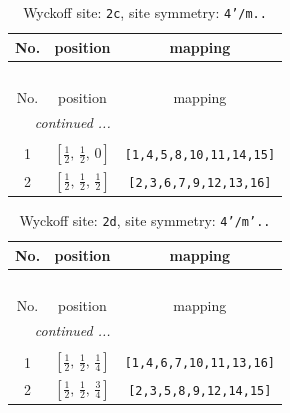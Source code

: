 \documentclass[fleqn,8pt]{jsarticle}
\begin{document}
\renewcommand{\arraystretch}{1.2}
\begin{longtable}{ccc}
\caption{Wyckoff site: {\tt 2c}, site symmetry: {\tt 4'/m..}}
 \\
 \hline \hline
No. & position & mapping \\ \hline \endfirsthead

\multicolumn{2}{l}{\tablename\ \thetable{}} \\
 \hline \hline
No. & position & mapping \\ \hline \endhead

 \hline \hline
\multicolumn{2}{r}{\footnotesize\it continued ...} \\ \endfoot

 \hline \hline
\multicolumn{2}{r}{} \\ \endlastfoot

1 & $\left[ \frac{1}{2},\, \frac{1}{2},\, 0 \right]$ & {\tt [1,4,5,8,10,11,14,15]} \\ \hline
2 & $\left[ \frac{1}{2},\, \frac{1}{2},\, \frac{1}{2} \right]$ & {\tt [2,3,6,7,9,12,13,16]} \\
\end{longtable}
\renewcommand{\arraystretch}{1.2}
\begin{longtable}{ccc}
\caption{Wyckoff site: {\tt 2d}, site symmetry: {\tt 4'/m'..}}
 \\
 \hline \hline
No. & position & mapping \\ \hline \endfirsthead

\multicolumn{2}{l}{\tablename\ \thetable{}} \\
 \hline \hline
No. & position & mapping \\ \hline \endhead

 \hline \hline
\multicolumn{2}{r}{\footnotesize\it continued ...} \\ \endfoot

 \hline \hline
\multicolumn{2}{r}{} \\ \endlastfoot

1 & $\left[ \frac{1}{2},\, \frac{1}{2},\, \frac{1}{4} \right]$ & {\tt [1,4,6,7,10,11,13,16]} \\ \hline
2 & $\left[ \frac{1}{2},\, \frac{1}{2},\, \frac{3}{4} \right]$ & {\tt [2,3,5,8,9,12,14,15]} \\
\end{longtable}
\renewcommand{\arraystretch}{1.2}
\end{document}
